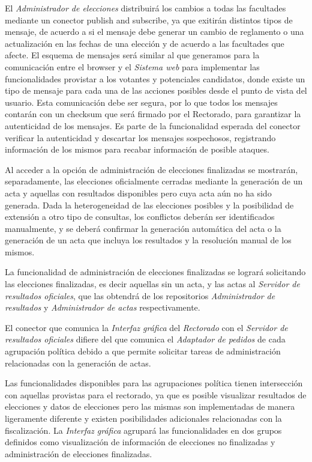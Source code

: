 El \emph{Administrador de elecciones} distribuirá los cambios a todas las facultades mediante un conector publish and subscribe, ya que exitirán distintos tipos de mensaje, de acuerdo a si el mensaje debe generar un cambio de reglamento o una actualización en las fechas de una elección y de acuerdo a las facultades que afecte. El esquema de mensajes será similar al que generamos para la comunicación entre el browser y el \emph{Sistema web} para implementar las funcionalidades provistar a los votantes y potenciales candidatos, donde existe un tipo de mensaje para cada una de las acciones posibles desde el punto de vista del usuario.
Esta comunicación debe ser segura, por lo que todos los mensajes contarán con un checksum que será firmado por el Rectorado, para garantizar la autenticidad de los mensajes. Es parte de la funcionalidad esperada del conector verificar la autenticidad y descartar los mensajes sospechosos, registrando información de los mismos para recabar información de posible ataques. 


Al acceder a la opción de administración de elecciones finalizadas se mostrarán, separadamente, las elecciones oficialmente cerradas mediante la generación de un acta y aquellas con resultados disponibles pero cuya acta aún no ha sido generada. Dada la heterogeneidad de las elecciones posibles y la posibilidad de extensión a otro tipo de consultas, los conflictos deberán ser identificados manualmente, y se deberá confirmar la generación automática del acta o la generación de un acta que incluya los resultados y la resolución manual de los mismos. 

La funcionalidad de administración de elecciones finalizadas se logrará solicitando las elecciones finalizadas, es decir aquellas sin un acta, y las actas al \emph{Servidor de resultados oficiales}, que las obtendrá de los repositorios \emph{Administrador de resultados} y \emph{Administrador de actas} respectivamente.

El conector que comunica la \emph{Interfaz gráfica} del \emph{Rectorado} con el \emph{Servidor de resultados oficiales} difiere del que comunica el \emph{Adaptador de pedidos} de cada agrupación política debido a que permite solicitar tareas de administración relacionadas con la generación de actas.




Las funcionalidades disponibles para las agrupaciones política tienen intersección con aquellas provistas para el rectorado, ya que es posible visualizar resultados de elecciones y datos de elecciones pero las mismas son implementadas de manera ligeramente diferente y existen posibilidades adicionales relacionadas con la fiscalización. La \emph{Interfaz gráfica} agrupará las funcionalidades en dos grupos definidos como visualización de información de elecciones no finalizadas y administración de elecciones finalizadas.


